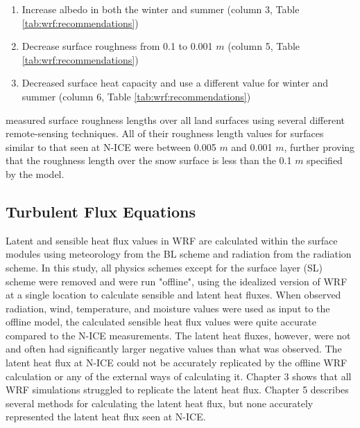 \begin{enumerate}
  \item Increase albedo in both the winter and summer (column 3, Table \ref{tab:wrf:recommendations})
   \item Decrease surface roughness from 0.1 to 0.001 $m$ (column 5, Table \ref{tab:wrf:recommendations})
  \item Decreased surface heat capacity and use a different value for winter and summer (column 6, Table \ref{tab:wrf:recommendations})
\end{enumerate}

\citet{floors:2023} measured surface roughness lengths over all land surfaces using several different remote-sensing techniques. All of their roughness length values for surfaces similar to that seen at N-ICE were between 0.005 $m$ and 0.001 $m$, further proving that the roughness length over the snow surface is less than the 0.1 $m$ specified by the model.

\subsection{Turbulent Flux Equations}
Latent and sensible heat flux values in WRF are calculated within the surface modules using meteorology from the BL scheme and radiation from the radiation scheme. In this study, all physics schemes except for the surface layer (SL) scheme were removed and were run "offline", using the idealized version of WRF at a single location to calculate sensible and latent heat fluxes. When observed radiation, wind, temperature, and moisture values were used as input to the offline model, the calculated sensible heat flux values were quite accurate compared to the N-ICE measurements. The latent heat fluxes, however, were not and often had significantly larger negative values than what was observed. The latent heat flux at N-ICE could not be accurately replicated by the offline WRF calculation or any of the external ways of calculating it. Chapter 3 shows that all WRF simulations struggled to replicate the latent heat flux. Chapter 5 describes several methods for calculating the latent heat flux, but none accurately represented the latent heat flux seen at N-ICE.

